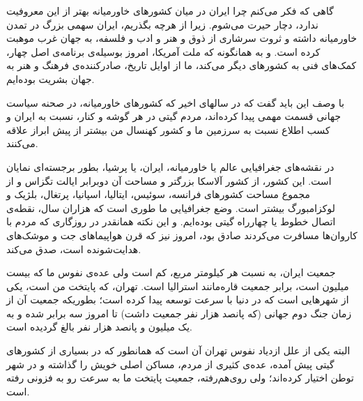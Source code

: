 \par
گاهی که فکر می‌کنم چرا ایران در میان کشورهای خاورمیانه بهتر از این معروفیت ندارد، دچار حیرت می‌شوم. زیرا از هرچه بگذریم، ایران سهمی بزرگ در تمدن خاورمیانه داشته و  ثروت سرشاری از ذوق و هنر و ادب و فلسفه، به جهان غرب موهبت کرده است. و به همانگونه که ملت آمریکا، امروز بوسیله‌ی برنامه‌ی اصل چهار، کمک‌های فنی به کشورهای دیگر می‌کند، ما از اوایل تاریخ، صادرکننده‌ی فرهنگ و هنر به جهان بشریت بوده‌ایم. 
\par
با وصف این باید گفت که در سالهای اخیر که کشورهای خاورمیانه، در صحنه سیاست جهانی قسمت مهمی پیدا کرده‌اند، مردم گیتی در هر گوشه و کنار، نسبت به ایران و کسب اطلاع نسبت به سرزمین ما و کشور کهنسال من بیشتر از پیش ابراز علاقه می‌کنند. 
\par
در نقشه‌های جغرافیایی عالم یا خاورمیانه، ایران، یا پرشیا، بطور برجسته‌ای نمایان است. این کشور، از کشور آلاسکا بزرگتر و مساحت آن دوبرابر ایالت تگزاس و از مجموع مساحت کشورهای فرانسه، سوئیس، ایتالیا، اسپانیا، پرتغال، بلژیک و لوکزامبورگ بیشتر است. وضع جغرافیایی ما طوری است که هزاران سال، نقطه‌ی اتصال خطوط یا چهارراه گیتی بوده‌ایم. و این نکته همانقدر در روزگاری که مردم با کاروان‌ها مسافرت می‌کردند صادق بود، امروز نیز که قرن هواپیماهای جت و موشک‌های هدایت‌شونده است، صدق می‌کند. 
\par
جمعیت ایران، به نسبت هر کیلومتر مربع، کم است ولی عده‌ی نفوس ما که بیست میلیون است، برابر جمعیت قاره‌مانند استرالیا است.
تهران، که پایتخت من است، یکی از شهرهایی است که در دنیا با سرعت توسعه پیدا کرده است؛ بطوریکه جمعیت آن از زمان جنگ دوم جهانی (که پانصد هزار نفر جمعیت داشت) تا امروز سه برابر شده و به یک میلیون و پانصد هزار نفر بالغ گردیده است.
\par
البته یکی از علل ازدیاد نفوس تهران آن است که همانطور که در بسیاری از کشورهای گیتی پیش آمده، عده‌ی کثیری از مردم، مساکن اصلی خویش را گذاشته و در شهر توطن اختیار کرده‌اند؛ ولی روی‌هم‌رفته، جمعیت پایتخت ما به سرعت رو به فزونی رفته است. 







 

